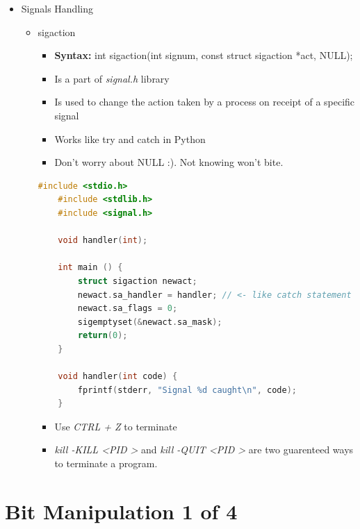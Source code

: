 \documentclass[12pt]{article}
\begin{document}
\begin{itemize}
    \item Signals Handling
    \begin{itemize}
        \item sigaction
        \begin{itemize}
            \item \textbf{Syntax:} int sigaction(int signum, const struct sigaction *act,
            NULL);
            \item Is a part of \textit{signal.h} library
            \item Is used to change the action taken by a process on receipt of
            a specific signal
            \item Works like try and catch in Python
            \item Don't worry about NULL :). Not knowing won't bite.
        \end{itemize}

        \bigskip

    \begin{lstlisting}[language=c]
    #include <stdio.h>
    #include <stdlib.h>
    #include <signal.h>

    void handler(int);

    int main () {
        struct sigaction newact;
        newact.sa_handler = handler; // <- like catch statement in python
        newact.sa_flags = 0;
        sigemptyset(&newact.sa_mask);
        return(0);
    }

    void handler(int code) {
        fprintf(stderr, "Signal %d caught\n", code);
    }
    \end{lstlisting}

        \begin{itemize}
            \item Use \textit{CTRL + Z} to terminate
            \item \textit{kill -KILL \textless PID \textgreater} and \textit{kill -QUIT \textless PID \textgreater}
            are two guarenteed ways to terminate a program.
        \end{itemize}

    \end{itemize}
\end{itemize}

\bigskip

\section*{Bit Manipulation 1 of 4}
\end{document}
